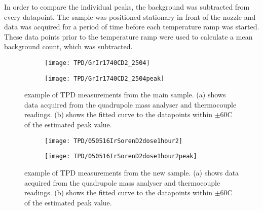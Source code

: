 In order to compare the individual peaks, the background was subtracted from every datapoint. The sample was positioned stationary in front of the nozzle and data was acquired for a period of time before each temperature ramp was started. These data points prior to the temperature ramp were used to calculate a mean background count, which was subtracted.

\begin{figure}[H]
  \centering
  \begin{subfigure}[b]{0.45\textwidth}
    \texttt{[image: TPD/GrIr1740CD2\_2504]}
    \caption{}
    \label{TPD:example}
  \end{subfigure}
  \begin{subfigure}[b]{0.45\textwidth}
    \texttt{[image: TPD/GrIr1740CD2\_2504peak]}
    \caption{}
    \label{TPD:peak}
  \end{subfigure}
  \caption{example of TPD measurements from the main sample. (a) shows data acquired from the quadrupole mass analyser and thermocouple readings. (b) shows the fitted curve to the datapoints within $\pm$60\degree C of the estimated peak value.}
  \label{TPD:win}
\end{figure}


\begin{figure}[H]
  \centering
  \begin{subfigure}[b]{0.45\textwidth}
    \texttt{[image: TPD/050516IrSorenD2dose1hour2]}
    \caption{}
    \label{TPD:example2}
  \end{subfigure}
  \begin{subfigure}[b]{0.45\textwidth}
    \texttt{[image: TPD/050516IrSorenD2dose1hour2peak]}
    \caption{}
    \label{TPD:peak2}
  \end{subfigure}
  \caption{example of TPD measurements from the new sample. (a) shows data acquired from the quadrupole mass analyser and thermocouple readings. (b) shows the fitted curve to the datapoints within $\pm$60\degree C of the estimated peak value.}
  \label{TPD:fail}
\end{figure}
